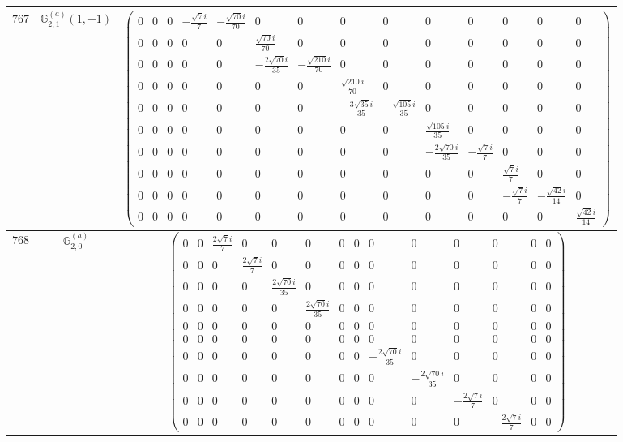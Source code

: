 \documentclass[fleqn,8pt,landscape]{jsarticle}
\begin{document}
\begin{center}
\begin{longtable}{ccc}
$ 767 $ & $ \mathbb{G}_{2,1}^{(a)}(1,-1) $ & $ \begin{pmatrix} 0 & 0 & 0 & - \frac{\sqrt{7} i}{7} & - \frac{\sqrt{70} i}{70} & 0 & 0 & 0 & 0 & 0 & 0 & 0 & 0 & 0 \\ 0 & 0 & 0 & 0 & 0 & \frac{\sqrt{70} i}{70} & 0 & 0 & 0 & 0 & 0 & 0 & 0 & 0 \\ 0 & 0 & 0 & 0 & 0 & - \frac{2 \sqrt{70} i}{35} & - \frac{\sqrt{210} i}{70} & 0 & 0 & 0 & 0 & 0 & 0 & 0 \\ 0 & 0 & 0 & 0 & 0 & 0 & 0 & \frac{\sqrt{210} i}{70} & 0 & 0 & 0 & 0 & 0 & 0 \\ 0 & 0 & 0 & 0 & 0 & 0 & 0 & - \frac{3 \sqrt{35} i}{35} & - \frac{\sqrt{105} i}{35} & 0 & 0 & 0 & 0 & 0 \\ 0 & 0 & 0 & 0 & 0 & 0 & 0 & 0 & 0 & \frac{\sqrt{105} i}{35} & 0 & 0 & 0 & 0 \\ 0 & 0 & 0 & 0 & 0 & 0 & 0 & 0 & 0 & - \frac{2 \sqrt{70} i}{35} & - \frac{\sqrt{7} i}{7} & 0 & 0 & 0 \\ 0 & 0 & 0 & 0 & 0 & 0 & 0 & 0 & 0 & 0 & 0 & \frac{\sqrt{7} i}{7} & 0 & 0 \\ 0 & 0 & 0 & 0 & 0 & 0 & 0 & 0 & 0 & 0 & 0 & - \frac{\sqrt{7} i}{7} & - \frac{\sqrt{42} i}{14} & 0 \\ 0 & 0 & 0 & 0 & 0 & 0 & 0 & 0 & 0 & 0 & 0 & 0 & 0 & \frac{\sqrt{42} i}{14} \end{pmatrix} $ \\ \hline
$ 768 $ & $ \mathbb{G}_{2,0}^{(a)} $ & $ \begin{pmatrix} 0 & 0 & \frac{2 \sqrt{7} i}{7} & 0 & 0 & 0 & 0 & 0 & 0 & 0 & 0 & 0 & 0 & 0 \\ 0 & 0 & 0 & \frac{2 \sqrt{7} i}{7} & 0 & 0 & 0 & 0 & 0 & 0 & 0 & 0 & 0 & 0 \\ 0 & 0 & 0 & 0 & \frac{2 \sqrt{70} i}{35} & 0 & 0 & 0 & 0 & 0 & 0 & 0 & 0 & 0 \\ 0 & 0 & 0 & 0 & 0 & \frac{2 \sqrt{70} i}{35} & 0 & 0 & 0 & 0 & 0 & 0 & 0 & 0 \\ 0 & 0 & 0 & 0 & 0 & 0 & 0 & 0 & 0 & 0 & 0 & 0 & 0 & 0 \\ 0 & 0 & 0 & 0 & 0 & 0 & 0 & 0 & 0 & 0 & 0 & 0 & 0 & 0 \\ 0 & 0 & 0 & 0 & 0 & 0 & 0 & 0 & - \frac{2 \sqrt{70} i}{35} & 0 & 0 & 0 & 0 & 0 \\ 0 & 0 & 0 & 0 & 0 & 0 & 0 & 0 & 0 & - \frac{2 \sqrt{70} i}{35} & 0 & 0 & 0 & 0 \\ 0 & 0 & 0 & 0 & 0 & 0 & 0 & 0 & 0 & 0 & - \frac{2 \sqrt{7} i}{7} & 0 & 0 & 0 \\ 0 & 0 & 0 & 0 & 0 & 0 & 0 & 0 & 0 & 0 & 0 & - \frac{2 \sqrt{7} i}{7} & 0 & 0 \end{pmatrix} $ \\ \hline

\end{longtable}
\end{center}
\end{document}

